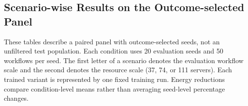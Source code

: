 
\subsection{Scenario-wise Results on the Outcome-selected Panel}
These tables describe a paired panel with outcome-selected seeds, not an unfiltered test population. Each condition uses 20 evaluation seeds and 50 workflows per seed. The first letter of a scenario denotes the evaluation workflow scale and the second denotes the resource scale (37, 74, or 111 servers). Each trained variant is represented by one fixed training run. Energy reductions compare condition-level means rather than averaging seed-level percentage changes.

